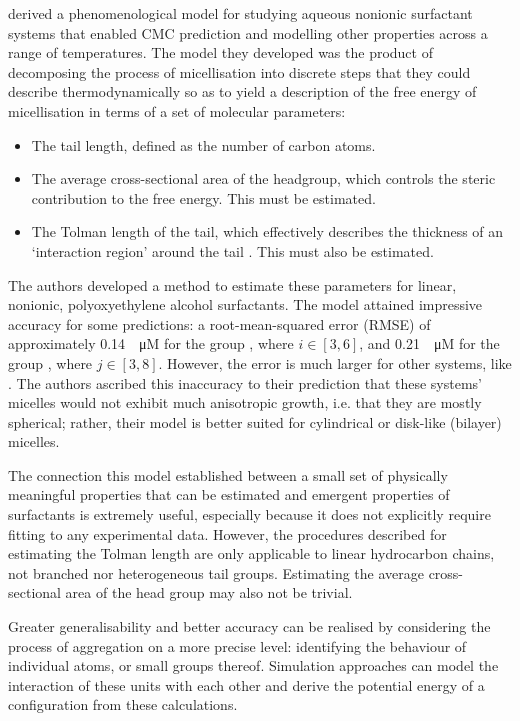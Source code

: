 \citet{puvvadaMolecularThermodynamicApproach1990} derived a phenomenological model for studying aqueous nonionic surfactant systems that enabled CMC prediction and modelling other properties across a range of temperatures. The model they developed was the product of decomposing the process of micellisation into discrete steps that they could describe thermodynamically so as to yield a description of the free energy of micellisation in terms of a set of molecular parameters:

\begin{itemize}
    \item The tail length, defined as the number of carbon atoms.
    \item The average cross-sectional area of the headgroup, which controls the
          steric contribution to the free energy. This must be estimated.
    \item The Tolman length of the tail, which effectively describes the
          thickness of an `interaction region' around the tail
          \cite{demiguelGibbsThermodynamicsSurface2021}. This must also be estimated.
\end{itemize}

The authors developed a method to estimate these parameters for linear,
nonionic, polyoxyethylene alcohol surfactants. The model attained impressive
accuracy for some predictions: a root-mean-squared error (RMSE) of approximately
\SI{0.14}{\log \micro M} for the group , where $i \in [3, 6]$, and
\SI{0.21}{\log \micro M} for the group , where $j \in [3, 8]$.
However, the error is much larger for other systems, like . The authors
ascribed this inaccuracy to their prediction that these systems' micelles would
not exhibit much anisotropic growth, i.e. that they are mostly spherical;
rather, their model is better suited for cylindrical or disk-like (bilayer)
micelles.

The connection this model established between a small set of physically meaningful properties that can be estimated and emergent properties of surfactants is extremely useful, especially because it does not explicitly require fitting to any experimental data. However, the procedures described for estimating the Tolman length are only applicable to linear hydrocarbon chains, not branched nor heterogeneous tail groups. Estimating the average cross-sectional area of the head group may also not be trivial.

Greater generalisability and better accuracy can be realised by considering the
process of aggregation on a more precise level: identifying the behaviour of
individual atoms, or small groups thereof. Simulation approaches can model the
interaction of these units with each other and derive the potential energy of a
configuration from these calculations.

